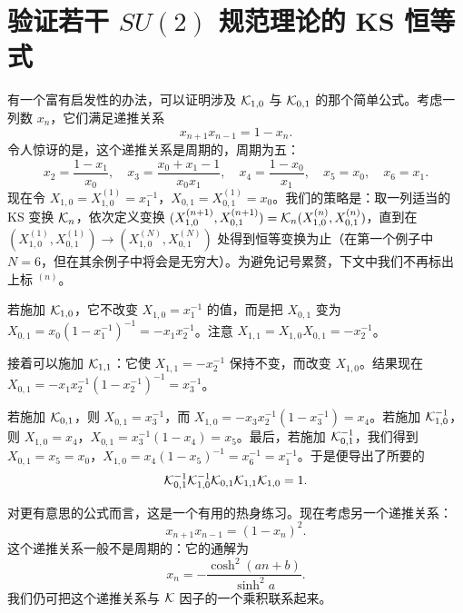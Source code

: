 \section{验证若干 $SU(2)$ 规范理论的 KS 恒等式}
\label{app:ks-product}

有一个富有启发性的办法，可以证明涉及 $\mathcal{K}_{1,0}$ 与 $\mathcal{K}_{0,1}$ 的那个简单公式。考虑一列数 $x_n$，它们满足递推关系
\begin{equation} \label{eq:appA-five-recursion}
x_{n+1} x_{n-1} = 1 - x_n.
\end{equation}
令人惊讶的是，这个递推关系是周期的，周期为五：
\begin{equation} \label{eq:appA-five-period}
x_2 = \frac{1-x_1}{x_0}, \quad x_3 = \frac{x_0+ x_1-1}{x_0 x_1}, \quad x_4 = \frac{1-x_0}{x_1}, \quad x_5 = x_0, \quad x_6=x_1.
\end{equation}
现在令 $X_{1,0}=X_{1,0}^{(1)}= x_1^{-1}$，$X_{0,1}=X_{0,1}^{(1)}= x_0$。我们的策略是：取一列适当的 KS 变换 $\mathcal{K}_n$，依次定义变换 $(X_{1,0}^{(n+1)},X_{0,1}^{(n+1)}) = \mathcal{K}_n (X_{1,0}^{(n)},X_{0,1}^{(n)})$，直到在 $(X_{1,0}^{(1)},X_{0,1}^{(1)})\to (X_{1,0}^{(N)},X_{0,1}^{(N)})$ 处得到恒等变换为止（在第一个例子中 $N=6$，但在其余例子中将会是无穷大）。为避免记号累赘，下文中我们不再标出上标 ${}^{(n)}$。

若施加 $\mathcal{K}_{1,0}$，它不改变 $X_{1,0} = x^{-1}_1$ 的值，而是把 $X_{0,1}$ 变为 $X_{0,1}=x_0(1-x^{-1}_1)^{-1} =- x_1 x^{-1}_2$。注意 $X_{1,1} = X_{1,0} X_{0,1} = -x_2^{-1}$。

接着可以施加 $\mathcal{K}_{1,1}$：它使 $X_{1,1} = -x^{-1}_2$ 保持不变，而改变 $X_{1,0}$。结果现在 $X_{0,1}=- x_1 x^{-1}_2 (1-x^{-1}_2)^{-1}= x_3^{-1}$。

若施加 $\mathcal{K}_{0,1}$，则 $X_{0,1} = x_3^{-1}$，而 $X_{1,0} = - x_3 x^{-1}_2 (1-x^{-1}_3)=x_4$。若施加 $\mathcal{K}_{1,0}^{-1}$，则 $X_{1,0} = x_4$，$X_{0,1} =x^{-1}_3 (1-x_4) = x_5$。最后，若施加 $\mathcal{K}_{0,1}^{-1}$，我们得到 $X_{0,1}=x_5=x_0$，$X_{1,0} = x_4 (1-x_5)^{-1} = x^{-1}_6=x^{-1}_1$。于是便导出了所要的
\begin{equation} \label{eq:appA-pentagon}
\mathcal{K}_{0,1}^{-1}\mathcal{K}_{1,0}^{-1}\mathcal{K}_{0,1}\mathcal{K}_{1,1}\mathcal{K}_{1,0} = 1.
\end{equation}

对更有意思的公式而言，这是一个有用的热身练习。现在考虑另一个递推关系：
\begin{equation} \label{eq:appA-sq-recursion}
x_{n+1} x_{n-1} = (1- x_n)^2.
\end{equation}
这个递推关系一般不是周期的：它的通解为
\begin{equation} \label{eq:appA-sq-solution}
x_n = -\frac{\cosh^2 (a n +b)}{\sinh^2 a}.
\end{equation}
我们仍可把这个递推关系与 $\mathcal{K}$ 因子的一个乘积联系起来。

